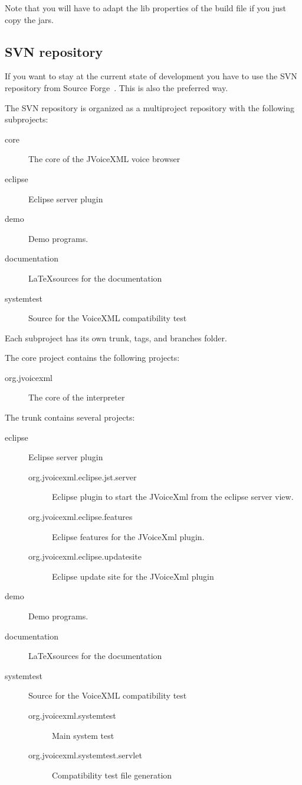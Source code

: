 \documentclass[11pt,a4paper]{article}
\begin{document}
Note that you will have to adapt the lib properties of the build file
if you just copy the jars.

\subsection{SVN repository}
\label{sec:svn-repository}

If you want to stay at the current state of development you have to use
the SVN repository from Source Forge~\cite{sourceforge}.
This is also the preferred way.

The SVN repository is organized as a multiproject repository with the following
subprojects:
\begin{description}
\item[core] The core of the JVoiceXML voice browser
\item[eclipse] Eclipse server plugin
\item[demo] Demo programs.
\item[documentation] \LaTeX sources for the documentation
\item[systemtest] Source for the VoiceXML compatibility test
\end{description}

Each subproject has its own trunk, tags, and branches folder.

The core project contains the following projects:
\begin{description}
\item[org.jvoicexml] The core of the interpreter
\end{description}

The trunk contains several projects:
\begin{description}
\item[eclipse] Eclipse server plugin
\begin{description}
\item[org.jvoicexml.eclipse.jst.server] Eclipse plugin to start the JVoiceXml
from the eclipse server view.
\item[org.jvoicexml.eclipse.features] Eclipse features for the JVoiceXml
plugin.
\item[org.jvoicexml.eclipse.updatesite] Eclipse update site for the
JVoiceXml plugin
\end{description}
\item[demo] Demo programs.
\item[documentation] \LaTeX sources for the documentation
\item[systemtest] Source for the VoiceXML compatibility test
\begin{description}
\item[org.jvoicexml.systemtest] Main system test
\item[org.jvoicexml.systemtest.servlet] Compatibility test file generation
\end{description}
\end{description}
\end{document}
